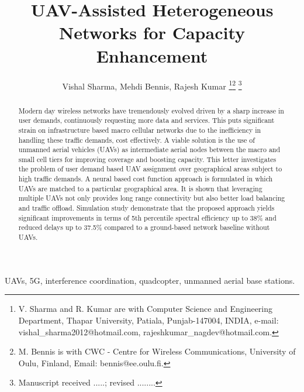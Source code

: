 \documentclass[journal]{IEEEtran}
\begin{document}
\raggedbottom
\title{UAV-Assisted Heterogeneous Networks for
Capacity Enhancement}

\author{Vishal Sharma, Mehdi Bennis, Rajesh Kumar
\thanks{V. Sharma and R. Kumar are with Computer Science and Engineering Department, Thapar University, Patiala,
Punjab-147004, INDIA, e-mail: vishal\_sharma2012@hotmail.com, rajeshkumar\_nagdev@hotmail.com.}\thanks{M. Bennis is with CWC - Centre for Wireless Communications, University of Oulu, Finland, Email: bennis@ee.oulu.fi.}
{\thanks{Manuscript received .....; revised ........}}}















\maketitle

\begin{abstract}
Modern day wireless networks have tremendously evolved driven by a sharp increase in user demands, continuously requesting more data and services. This puts significant strain on infrastructure based macro cellular networks due to the inefficiency in handling these traffic demands, cost effectively. A viable solution is the use of unmanned aerial vehicles (UAVs) as intermediate aerial nodes between the macro and small cell tiers for improving coverage and boosting capacity. This letter investigates the problem of user demand based UAV assignment over geographical areas subject to high traffic demands. A neural based cost function approach is formulated in which UAVs are matched to a particular geographical area. It is shown that leveraging multiple UAVs not only provides long range connectivity but also better load balancing and traffic offload. Simulation study demonstrate that the proposed approach yields significant improvements in terms of 5th percentile spectral efficiency up to 38\% and reduced delays up to 37.5\% compared to a ground-based network baseline without UAVs.
\end{abstract}

\begin{IEEEkeywords}
UAVs, 5G, interference coordination, quadcopter, unmanned aerial base stations.
 \end{IEEEkeywords}
\end{document}
